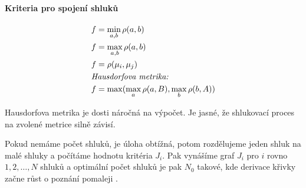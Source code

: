 \paragraph{Kriteria pro spojení shluků}
\begin{align}
f &= \min\limits_{a,b}\rho(a,b)\\
f &= \max\limits_{a,b}\rho(a,b)\\
f &= \rho(\mu_i,\mu_j)\\
\noalign{\hbox{\emph{Hausdorfova metrika: }}}\nonumber
f &= \max(\max\limits_a\rho(a,B),\max\limits_b\rho(b,A))
\end{align}

Hausdorfova metrika je dosti náročná na výpočet. Je jasné, že shlukovací proces na zvolené metrice silně závisí.

Pokud nemáme počet shluků, je úloha obtížná, potom rozdělujeme jeden shluk na malé shluky a počítáme hodnotu
kritéria $J_i$. Pak vynášíme graf $J_i$ pro $i$ rovno $1,2,\dots,N$ shluků a optimální počet shluků je pak $N_0$
takové, kde derivace křivky začne růst o poznání pomaleji .


